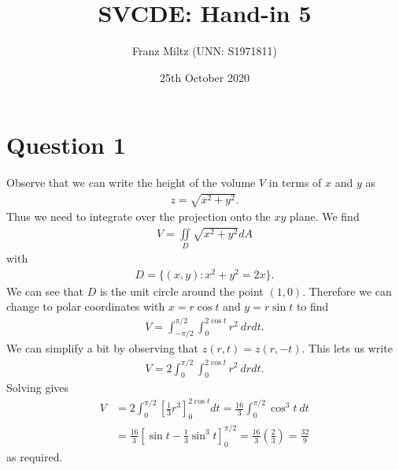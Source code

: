 \documentclass{article}
\newcommand{\di}{\iint\limits}
\begin{document}
\title{SVCDE: Hand-in 5}
\author{Franz Miltz (UNN: S1971811)}
\date{25th October 2020}
\maketitle
\section*{Question 1}
Observe that we can write the height of the volume $V$ in terms of $x$ and $y$ as 
\begin{align*}
  z = \sqrt{x^2 + y^2} .
\end{align*}
Thus we need to integrate over the projection onto the $xy$ plane. We find
\begin{align*}
  V = \di_D \sqrt{x^2+y^2}dA
\end{align*}
with
\begin{align*}
  D = \{(x,y) : x^2 + y^2 = 2x\}.
\end{align*}
We can see that $D$ is the unit circle around the point $(1,0)$. Therefore we can 
change to polar coordinates with $x=r\cos t$ and $y=r\sin t$ to find
\begin{align*}
  V = \int_{-\pi/2}^{\pi/2}\int_0^{2\cos t} r^2\: dr dt.
\end{align*}
We can simplify a bit by observing that $z(r,t)=z(r,-t)$. This lets us write
\begin{align*}
  V = 2\int_{0}^{\pi/2}\int_0^{2\cos t} r^2\: dr dt.
\end{align*}
Solving gives 
\begin{align*}
  V &= 2\int_0^{\pi/2}\left[\frac{1}{3}r^3\right]_0^{2\cos t}dt
  =\frac{16}{3}\int_0^{\pi/2}\cos^3 t\:dt\\
  &=\frac{16}{3}\left[\sin t - \frac{1}{3}\sin^3 t\right]_0^{\pi/2}
  =\frac{16}{3}\left(\frac{2}{3}\right) = \frac{32}{9}
\end{align*}
as required.
\end{document}
